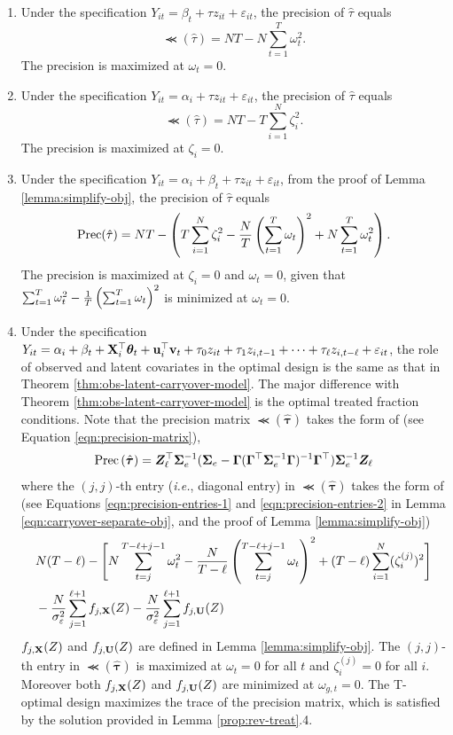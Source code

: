 		\begin{enumerate}
		    \item Under the specification  $Y_{it} =\beta_t+ \tau z_{it} + \varepsilon_{it}$, the precision of $\hat{\tau}$ equals  
		    \[\Prec(\hat{\tau}) = NT - N \sum_{t=1}^T \omega_t^2.  \]
		    The precision is maximized at $\omega_t = 0$.
		    \item Under the specification $Y_{it}= \alpha_i + \tau z_{it} + \varepsilon_{it}$, the precision of $\hat{\tau}$ equals  
		    \[\Prec(\hat{\tau}) = NT - T \sum_{i = 1}^N \zeta_i^2. \]
		    The precision is maximized at $\zeta_i = 0$.
		    \item  Under the specification $Y_{it}= \alpha_i + \beta_t + \tau z_{it} + \varepsilon_{it}$, from the proof of Lemma \ref{lemma:simplify-obj}, the precision of $\hat{\tau}$ equals 
		    \[\mathrm{Prec}(\hat{\tau}) = NT - \left(T \sum_{i = 1}^{N} \zeta_i^2 -\frac{N}{T} \left(\sum_{t=1}^T \omega_t  \right)^2 + N \sum_{t = 1}^T \omega_t^2 \right). \]
		    The precision is maximized at $\zeta_i = 0$ and $\omega_t = 0$, given that $\sum_{t = 1}^T \omega_t^2 - \frac{1}{T}  \left(\sum_{t=1}^T \omega_t  \right)^2$ is minimized at $\omega_t = 0$.
		    \item Under the specification $Y_{it} = \alpha_i +  \beta_t +  \mathbf{X}^\top_i  \bm{\theta}_t+  \mathbf{u}^\top_i \mathbf{v}_t + \tau_0 z_{it} + \tau_1 z_{i,t-1} + \cdots + \tau_{\ell} z_{i,t-\ell} + \varepsilon_{it}$, the role of observed and latent covariates in the optimal design is the same as that in Theorem \ref{thm:obs-latent-carryover-model}.   The major difference with Theorem \ref{thm:obs-latent-carryover-model} is the optimal treated fraction conditions. Note that the precision matrix $\Prec(\hat{\bm{\tau}})$ takes the form of (see Equation \eqref{eqn:precision-matrix}), 
      \[\mathrm{Prec}\left( \hat{\bm{\tau}}\right) =  \bm{Z}_\ell^\top  \bm{\Sigma}^{-1}_e  ( \bm{\Sigma}_e - \bm{\Gamma} (\bm{\Gamma}^\top \bm{\Sigma}^{-1}_e  \bm{\Gamma})^{-1} \bm{\Gamma}^\top) \bm{\Sigma}^{-1}_e  \bm{Z}_\ell  \]
where the $(j,j)$-th entry ({\it i.e.}, diagonal entry) in $\Prec\left( \hat{\bm{\tau}}\right)$ takes the form of (see Equations \eqref{eqn:precision-entries-1} and \eqref{eqn:precision-entries-2} in Lemma \ref{eqn:carryover-separate-obj}, and the proof of Lemma \ref{lemma:simplify-obj})
\begin{align*}
    & N(T-\ell) -   \Bigg[  N \sum_{t=j}^{T - \ell+j-1} \omega_t^2   - \frac{N}{T - \ell}  \left( \sum_{t=j}^{T - \ell+j-1} \omega_t  \right)^2    + (T - \ell) \sum_{i = 1}^N (\zeta_i^{(j)})^2 \Bigg] \\ & - \frac{N}{\sigma_\varepsilon^2} \sum_{j = 1}^{\ell + 1} f_{j,\mathbf{X}}(Z) - \frac{N}{\sigma_\varepsilon^2} \sum_{j = 1}^{\ell + 1} f_{j,\mathbf{U}}(Z)
\end{align*}
$f_{j,\mathbf{X}}(Z)$ and $f_{j,\mathbf{U}}(Z)$ are defined in Lemma \ref{lemma:simplify-obj}.
The $(j,j)$-th entry in $\Prec(\hat{\bm{\tau}})$ is maximized at $\omega_t = 0$ for all $t$ and $\zeta_i^{(j)} = 0$ for all $i$. Moreover both $f_{j,\mathbf{X}}(Z)$ and $f_{j,\mathbf{U}}(Z)$ are minimized at $\omega_{g,t} = 0$. The T-optimal design maximizes the trace of the precision matrix, which is satisfied by the solution provided in Lemma \ref{prop:rev-treat}.4. 
		\end{enumerate}
